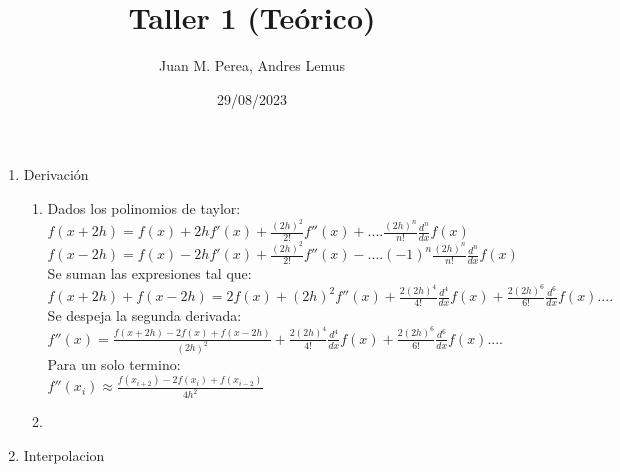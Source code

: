 \documentclass{article}
\title{Taller 1 (Teórico)}
\author{Juan M. Perea, Andres Lemus}
\date{29/08/2023}
\begin{document}
\maketitle

\begin{enumerate}
\renewcommand{\theenumi}{\roman{enumi}}
\item Derivación
	\begin{enumerate}
	\renewcommand{\theenumii}{\arabic{enumii}}
	\item
		Dados los polinomios de taylor:\\
		$f(x+2h)=f(x)+2hf'(x)+\frac{(2h)^2}{2!}f''(x)+....\frac{(2h)^n}{n!}\frac{d^n}{dx}f(x)$\\
		$f(x-2h)=f(x)-2hf'(x)+\frac{(2h)^2}{2!}f''(x)-....(-1)^n\frac{(2h)^n}{n!}\frac{d^n}{dx}f(x)$\\
		Se suman las expresiones tal que:\\
		$f(x+2h)+f(x-2h)=2f(x)+(2h)^2f''(x)+\frac{2(2h)^4}{4!}\frac{d^4}{dx}f(x)+\frac{2(2h)^6}{6!}\frac{d^6}{dx}f(x)....$\\
		Se despeja la segunda derivada:\\
		$f''(x)=\frac{f(x+2h)-2f(x)+f(x-2h)}{(2h)^2}+\frac{2(2h)^4}{4!}\frac{d^4}{dx}f(x)+\frac{2(2h)^6}{6!}\frac{d^6}{dx}f(x)....$\\
		Para un solo termino:\\
		$f''(x_i)\approx\frac{f(x_{i+2})-2f(x_i)+f(x_{i-2})}{4h^2}$
	\item
	\end{enumerate}
\item Interpolacion
\end{enumerate}
\end{document}
